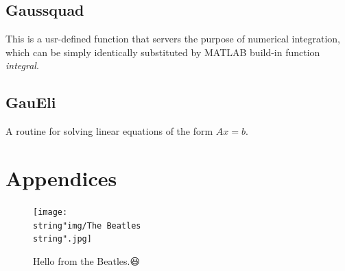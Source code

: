 \documentclass[a4paper,english]{article}
\begin{document}
	
	
	
	
	
	\subsection{Gaussquad}
	This is a usr-defined function that servers the purpose of 
	numerical integration, which can be simply identically substituted by
	MATLAB build-in function \emph{integral}.
	
	
	
	\subsection{GauEli}
	A routine for solving linear equations of the form $Ax=b$.
	
	
	
	
	\medskip
	
	


	\appendix
	\section*{Appendices}
	
	\begin{figure}[!hb]
		\centering
		\texttt{[image: \\string"img/The 
		Beatles\\string".jpg]}
		\caption*{Hello from the Beatles.😃}
		\label{fig:the-beatles}
	\end{figure}
	
\end{document}
